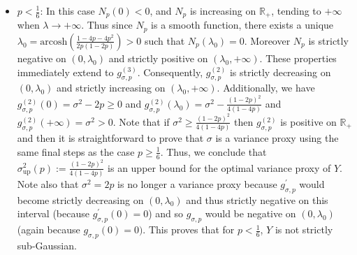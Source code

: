 \documentclass[a4paper, 10pt]{article}
\newcommand{\arcosh}{\text{arcosh}}
\theoremstyle{definition}
\begin{document}
\begin{itemize}
    \item $p<\frac{1}{6}$: In this case $N_{p}(0)<0$, and $N_{p}$ is increasing on $\mathbb{R}_+$, tending to $+\infty$ when $\lambda\to +\infty$. Thus since $N_{p}$ is a smooth function, there exists a unique $\lambda_0=\arcosh\left(\frac{1-4p-4p^2}{2p(1-2p)}\right)>0$ such that $N_{p}(\lambda_0)=0$. Moreover $N_{p}$ is strictly negative on $(0,\lambda_0)$ and strictly positive on $(\lambda_0,+\infty)$. These properties immediately extend to $g_{\sigma,p}^{(3)}$. Consequently, $g_{\sigma,p}^{(2)}$ is strictly decreasing on $(0,\lambda_0)$ and strictly increasing on $(\lambda_0,+\infty)$. Additionally, we have $g_{\sigma,p}^{(2)}(0)=\sigma^2-2p\geq 0$ and $g_{\sigma,p}^{(2)}(\lambda_0)=\sigma^2-\frac{(1-2p)^2}{4(1-4p)}$ and $g_{\sigma,p}^{(2)}(+\infty)=\sigma^2>0$. Note that if $\sigma^2\geq \frac{(1-2p)^2}{4(1-4p)}$ then $g^{(2)}_{\sigma,p}$ is positive on $\mathbb{R}_+$ and then it is straightforward to prove that $\sigma$ is a variance proxy using the same final steps as the case $p\geq\frac{1}{6}$. Thus, we conclude that $\sigma_{\text{up}}^2(p):=\frac{(1-2p)^2}{4(1-4p)}$ {is an upper bound for the optimal variance proxy of $Y$}. Note also that $\sigma^2=2p$ is no longer a variance proxy because $g^{'}_{\sigma,p}$ would become strictly decreasing on $(0,\lambda_0)$ and thus strictly negative on this interval (because $g^{'}_{\sigma,p}(0)=0$) and so $g_{\sigma,p}$ would be negative on $(0,\lambda_0)$ (again because $g_{\sigma,p}(0)=0)$. This proves that {for $p<\frac{1}{6}$, $Y$ is not strictly sub-Gaussian}. 
\end{itemize}
\end{document}
